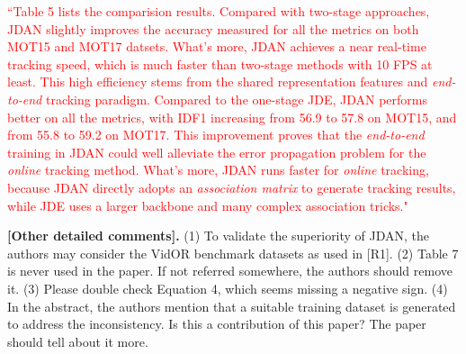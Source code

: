 \documentclass[12pt,journal,onecolumn]{IEEEtran}
\begin{document}
\textcolor{red}{
``Table 5 lists the comparision results.
Compared with two-stage approaches, JDAN slightly improves the accuracy measured for all the metrics on both MOT15 and MOT17 datsets.
What's more, JDAN achieves a near real-time tracking speed, which is much faster than two-stage methods with 10 FPS at least.
This high efficiency stems from the shared representation features and \emph{end-to-end} tracking paradigm.
Compared to the one-stage JDE, JDAN performs better on all the metrics, with IDF1 increasing from 56.9 to 57.8 on MOT15, and from 55.8 to 59.2 on MOT17.
This improvement proves that the \emph{end-to-end} training in JDAN could well alleviate the error propagation problem for the \emph{online} tracking method.
What's more, JDAN runs faster for \emph{online} tracking, because JDAN directly adopts an \emph{association matrix} to generate tracking results, while JDE uses a larger backbone and many complex association tricks."
}
\vspace{8pt} 

\textbf{[Other detailed comments].} 
(1)  To validate the superiority of JDAN, the authors may consider the VidOR benchmark datasets as used in [R1].
(2)  Table 7 is never used in the paper. If not referred somewhere, the authors should remove it.
(3)  Please double check Equation 4, which seems missing a negative sign.
(4)  In the abstract, the authors mention that a suitable training dataset is generated to address the inconsistency. Is this a contribution of this paper? The paper should tell about it more.
\end{document}
